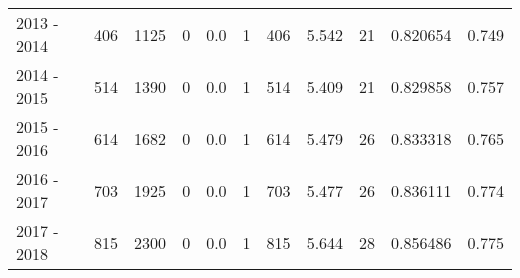 \begin{tabular}{lrrrrrrrllr}
2013 - 2014 &      406 &     1125 &                 0 &               0.0 &                       1 &                        406 &       5.542 &            21 &   0.820654 &             0.749 \\
2014 - 2015 &      514 &     1390 &                 0 &               0.0 &                       1 &                        514 &       5.409 &            21 &   0.829858 &             0.757 \\
2015 - 2016 &      614 &     1682 &                 0 &               0.0 &                       1 &                        614 &       5.479 &            26 &   0.833318 &             0.765 \\
2016 - 2017 &      703 &     1925 &                 0 &               0.0 &                       1 &                        703 &       5.477 &            26 &   0.836111 &             0.774 \\
2017 - 2018 &      815 &     2300 &                 0 &               0.0 &                       1 &                        815 &       5.644 &            28 &   0.856486 &             0.775 \\
\bottomrule
\end{tabular}
